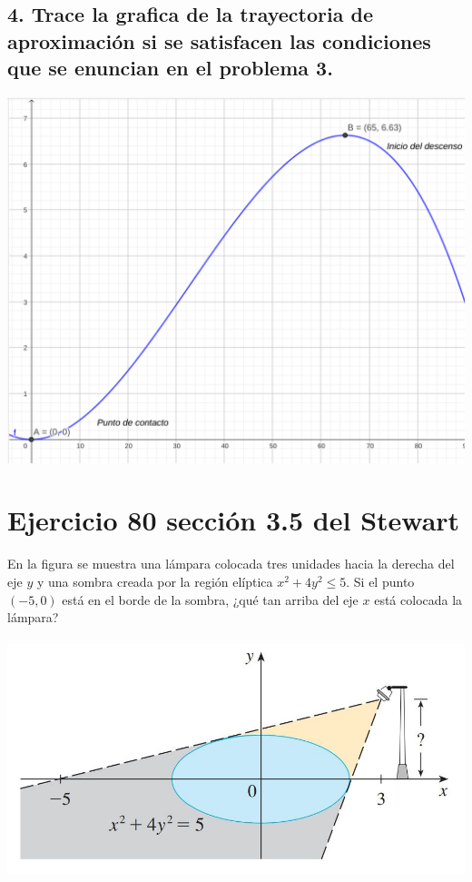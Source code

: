 \documentclass[11pt,letterpaper]{article}
\begin{document}
\subsection*{4. 
Trace la grafica de la trayectoria de aproximación si se satisfacen las condiciones que se enuncian en el problema 3.}
\begin{center}
    \includegraphics[width=15cm]{./imagenes/graficavion.png}
  \end{center}



\section*{Ejercicio 80 sección 3.5 del Stewart}

En la figura se muestra una lámpara colocada tres unidades hacia la derecha del eje \( y \) y una sombra creada por la región elíptica \( x^2 + 4y^2 \leq 5 \). Si el punto \( (-5, 0) \) está en el borde de la sombra, ¿qué tan arriba del eje \( x \) está colocada la lámpara?

\begin{center}
    \includegraphics[height=7.0cm]{./imagenes/lampara.jpg}
\end{center}
\end{document}
